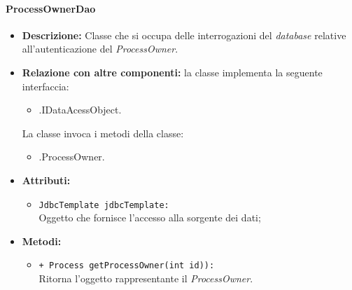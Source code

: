 \paragraph{ProcessOwnerDao}
\label{processownerdao}
\begin{flushleft}
\begin{itemize}
\item \textbf{Descrizione:} Classe che si occupa delle interrogazioni del \textit{database} relative all'autenticazione del \textit{ProcessOwner}.
\item \textbf{Relazione con altre componenti:} la classe implementa la seguente interfaccia:
		\begin{itemize}
			\item \smodel{}.IDataAcessObject.
		\end{itemize}
		La classe invoca i metodi della classe:
		\begin{itemize}
			\item \smodel{}.ProcessOwner.
		\end{itemize}
\item \textbf{Attributi:}
\begin{sloppypar}
\begin{itemize}
\item \texttt{JdbcTemplate jdbcTemplate:}\\ Oggetto che fornisce l'accesso alla sorgente dei dati;
\end{itemize}
\end{sloppypar}
\item \textbf{Metodi:}
\begin{sloppypar}
\begin{itemize}
\item \texttt{+ Process getProcessOwner(int id)):}\\ Ritorna l'oggetto rappresentante il \textit{ProcessOwner}. 
\end{itemize}
\end{sloppypar}
\end{itemize}
\end{flushleft}

